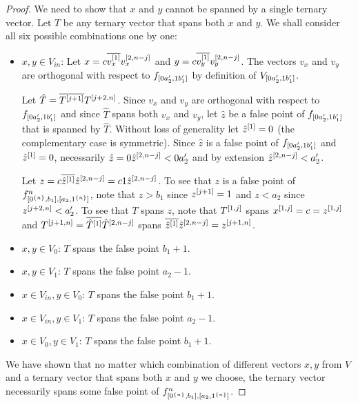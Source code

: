 \begin{proof}
We need to show that $x$ and $y$
cannot be spanned by a single ternary vector.
Let $T$ be any ternary vector that spans both $x$ and $y$.
We shall consider all six possible combinations
one by one:
\begin{itemize}
\item $x,y \in V_{in}$:
Let $x = c \overline{v_x^{[1]}} v_x^{[2, n-j]}$
and $y = c \overline{v_y^{[1]}} v_y^{[2, n-j]}$.
The vectors $v_x$ and $v_y$ are orthogonal with respect to $f_{[0 a_2', 1 b_1']}$
by definition of $V_{[0 a_2', 1 b_1']}$.

Let $\hat{T} = \overline{T^{[j+1]}} T^{[j+2, n]}$.
Since $v_x$ and $v_y$ are orthogonal with respect to
$f_{[0 a_2', 1 b_1']}$
and since $\hat{T}$ spans both $v_x$ and $v_y$,
let $\hat{z}$ be a false point
of $f_{[0 a_2', 1 b_1']}$
that is spanned by $\hat{T}$.
Without loss of generality let $\hat{z}^{[1]} = 0$
(the complementary case is symmetric).
Since $\hat{z}$ is a false point
of $f_{[0 a_2', 1 b_1']}$
and $\hat{z}^{[1]} = 0$,
necessarily
$\hat{z} = 0 \hat{z}^{[2, n-j]} < 0 a_2'$
and by extension
$\hat{z}^{[2, n-j]} < a_2'$.

Let $z
= c \overline{\hat{z}^{[1]}} \hat{z}^{[2, n-j]}
= c 1 \hat{z}^{[2, n-j]}$.
To see that $z$ is a false point of $f^{n}_{[0^{\{n\}}, b_1], [a_2, 1^{\{n\}}]}$,
note that $z > b_1$ since $z^{[j+1]} = 1$
and $z < a_2$ since $z^{[j+2, n]} < a_2'$.
To see that $T$ spans $z$,
note that
$T^{[1, j]}$ spans
$x^{[1, j]} = c = z^{[1, j]}$
and $T^{[j+1, n]} = \overline{\hat{T}^{[1]}} \hat{T}^{[2, n-j]}$ spans $\overline{\hat{z}^{[1]}} \hat{z}^{[2, n-j]} = z^{[j+1, n]}$.
\item $x,y \in V_0$:
$T$ spans the false point $b_1 + 1$.
\item $x,y \in V_1$:
$T$ spans the false point $a_2 - 1$.
\item $x \in V_{in}, y \in V_0$:
$T$ spans the false point $b_1 + 1$.
\item $x \in V_{in}, y \in V_1$:
$T$ spans the false point $a_2 - 1$.
\item $x \in V_0, y \in V_1$:
$T$ spans the false point $b_1 + 1$.
\end{itemize}

We have shown that no matter which combination
of different vectors $x, y$ from $V$
and a ternary vector that spans both $x$ and $y$
we choose,
the ternary vector necessarily spans some false point
of $f^{n}_{[0^{\{n\}}, b_1], [a_2, 1^{\{n\}}]}$.
\end{proof}


